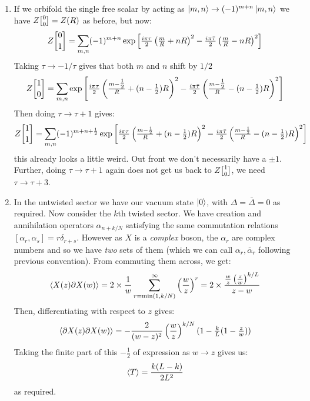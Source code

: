 \documentclass[11pt]{article}
\begin{document}
\begin{enumerate}
	\item If we orbifold the single free scalar by acting as $\ket{m, n} \to (-1)^{m+n} \ket{m, n}$ we have $Z\twist00 = Z(R)$ as before, but now:
	\[
		Z\twist01 = \sum_{m,n} (-1)^{m+n} \exp\left[\tfrac{i \pi \tau}{2} \left( \tfrac{m}{R} + n R \right)^2 - \tfrac{i \pi \bar \tau}{2} \left( \tfrac{m}{R} - n R \right)^2  \right]
	\]
	Taking $\tau \to -1/\tau$ gives that both $m$ and $n$ shift by $1/2$
	\[
		Z\twist10 = \sum_{m,n} \exp\left[\tfrac{i \pi \tau}{2} \left( \tfrac{m-\tfrac12}{R} + (n-\tfrac12) R \right)^2 - \tfrac{i \pi \bar \tau}{2} \left( \tfrac{m-\tfrac12}{R} - (n-\tfrac12) R \right)^2  \right]
	\]
	Then doing $\tau \to \tau+1$ gives:
	\[
		Z\twist11 = \sum_{m,n} (-1)^{m+n+\frac12} \exp\left[\tfrac{i \pi \tau}{2} \left( \tfrac{m-\frac12}{R} + (n-\tfrac12) R \right)^2 - \tfrac{i \pi \bar \tau}{2} \left( \tfrac{m-\frac12}{R} - (n-\tfrac12) R \right)^2 \right]
	\]
	this already looks a little weird. Out front we don't necessarily have a $\pm 1$. Further, doing $\tau \to \tau+1$ again does not get us back to $Z\twist10$, we need $\tau \to \tau+3$.
	\item In the untwisted sector we have our vacuum state $\ket0$, with $\Delta = \bar \Delta = 0$ as required. Now consider the $k$th twisted sector. We have creation and annihilation operators $\alpha_{n+k/N}$ satisfying the same commutation relations $[\alpha_r, \alpha_s] = r \delta_{r+s}$. However as $X$ is a \emph{complex} boson, the $\alpha_r$ are complex numbers and so we have \emph{two} sets of them (which we can call $\alpha_r, \bar \alpha_r$ following previous convention). From commuting them across, we get:
	\[
		\braket{X(z) \partial X(w)} = 2 \times \frac1w \sum_{r=\mathrm{min}(1,k/N)}^\infty \left( \frac{w}{z} \right)^r = 2 \times \frac{\frac{w}{z} \left(\frac{z}{w} \right)^{k/L}}{z-w}
	\]
	Then, differentiating with respect to $z$ gives:
	\[
		\braket{\partial X(z) \partial X(w)} = - \frac{2}{(w-z)^2} \left(\frac{w}{z}\right)^{k/N} (1 - \tfrac{k}{L} (1 - \tfrac{z}{w}) )
	\]
	Taking the finite part of this $-\frac12$ of expression as $w \to z$ gives us:
	\[
		\braket{T} = \frac{k (L-k)}{2 L^2}
	\]
	as required. 
	

\end{enumerate}
\end{document}

